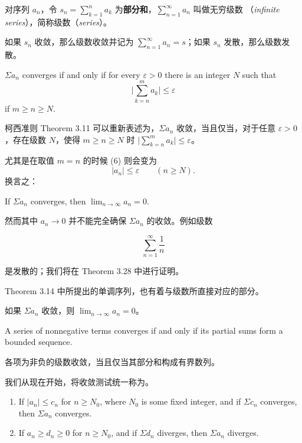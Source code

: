 \documentclass[../poma-notes.tex]{subfiles}
\begin{document}
\begin{anote}\mbox{}\par
  对序列 $a_n$，令 $s_n = \sum_{k=1}^{n} a_k$ 为\textbf{部分和}，$\sum_{n=1}^{\infty} a_n$ 叫做无穷级数
  （\textit{infinite series}），简称级数（\textit{series}）。

  如果 $s_n$ 收敛，那么级数收敛并记为 $\sum_{n=1}^{\infty} a_n = s$；如果 $s_n$ 发散，那么级数发散。
\end{anote}

\begin{theorem}
  $\Sigma a_n$ converges if and only if for every $\varepsilon > 0$ there is an integer $N$ such that
  \begin{equation}
    \Bigg| \sum_{k=n}^{m} a_k \Bigg| \le \varepsilon
  \end{equation}
  if $m \ge n \ge N$.
\end{theorem}

\begin{anote}
  柯西准则 Theorem 3.11 可以重新表述为，$\Sigma a_n$ 收敛，当且仅当，对于任意 $\varepsilon > 0$，存在级数 $N$，使得
  $m \ge n \ge N$ 时 $\big| \sum_{k=n}^{m} a_k \big| \le \varepsilon$。
\end{anote}

尤其是在取值 $m = n$ 的时候 (6) 则会变为
\[|a_n| \le \varepsilon \qquad (n \ge N).\]
换言之：

\begin{theorem}
  If $\Sigma a_n$ converges, then $\lim_{n \to \infty} a_n = 0$.
\end{theorem}

然而其中 $a_n \to 0$ 并不能完全确保 $\Sigma a_n$ 的收敛。例如级数

\[\sum_{n=1}^{\infty} \frac{1}{n}\]

是发散的；我们将在 Theorem 3.28 中进行证明。

Theorem 3.14 中所提出的单调序列，也有着与级数所直接对应的部分。

\anote 如果 $\Sigma a_n$ 收敛，则 $\lim_{n \to \infty} a_n = 0$。

\begin{theorem}
  A series of nonnegative terms converges if and only if its partial sums form a bounded sequence.
\end{theorem}

\anote 各项为非负的级数收敛，当且仅当其部分和构成有界数列。

我们从现在开始，将收敛测试统一称为。

\begin{theorem}\mbox{}\par
  \begin{enumerate}[label=(\alph*)]
    \item If $|a_n| \le c_n$ for $n \ge N_0$, where $N_0$ is some fixed integer, and if $\Sigma c_n$ converges,
          then $\Sigma a_n$ converges.
    \item If $a_n \ge d_n \ge 0$ for $n \ge N_0$, and if $\Sigma d_n$ diverges, then $\Sigma a_n$ diverges.
  \end{enumerate}
\end{theorem}
\end{document}

